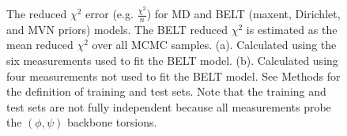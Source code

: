 \documentclass[journal=jacsat,manuscript=article]{achemso}
\begin{document}
\begin{figure}
\caption{
The reduced $\chi^2$ error (e.g. $\frac{\chi^2}{n}$) for MD and BELT (maxent, Dirichlet, and MVN priors) models.  The BELT reduced $\chi^2$ is estimated as the mean reduced $\chi^2$ over all MCMC samples.  (a).  Calculated using the six measurements used to fit the BELT model.  (b).  Calculated using four measurements not used to fit the BELT model.  See Methods for the definition of training and test sets.  Note that the training and test sets are not fully independent because all measurements probe the $(\phi, \psi)$ backbone torsions.
}
\label{figure:ChiSquared}
\end{figure}
\end{document}
